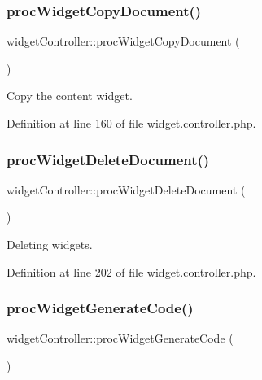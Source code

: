 \subsubsection{\texorpdfstring{proc\+Widget\+Copy\+Document()}{procWidgetCopyDocument()}}
{\footnotesize\ttfamily widget\+Controller\+::proc\+Widget\+Copy\+Document (\begin{DoxyParamCaption}{ }\end{DoxyParamCaption})}



Copy the content widget. 



Definition at line 160 of file widget.\+controller.\+php.

\hypertarget{classwidgetController_a9223bf4586acbe9f3262cde3cff193a7}{}\label{classwidgetController_a9223bf4586acbe9f3262cde3cff193a7} 
\subsubsection{\texorpdfstring{proc\+Widget\+Delete\+Document()}{procWidgetDeleteDocument()}}
{\footnotesize\ttfamily widget\+Controller\+::proc\+Widget\+Delete\+Document (\begin{DoxyParamCaption}{ }\end{DoxyParamCaption})}



Deleting widgets. 



Definition at line 202 of file widget.\+controller.\+php.

\hypertarget{classwidgetController_ab914871b42db6378aa78aa682daea6a3}{}\label{classwidgetController_ab914871b42db6378aa78aa682daea6a3} 
\subsubsection{\texorpdfstring{proc\+Widget\+Generate\+Code()}{procWidgetGenerateCode()}}
{\footnotesize\ttfamily widget\+Controller\+::proc\+Widget\+Generate\+Code (\begin{DoxyParamCaption}{ }\end{DoxyParamCaption})}



